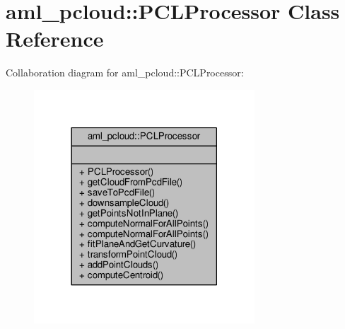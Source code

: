 \hypertarget{classaml__pcloud_1_1_p_c_l_processor}{\section{aml\-\_\-pcloud\-:\-:P\-C\-L\-Processor Class Reference}
\label{classaml__pcloud_1_1_p_c_l_processor}
}


Collaboration diagram for aml\-\_\-pcloud\-:\-:P\-C\-L\-Processor\-:
\nopagebreak
\begin{figure}[H]
\begin{center}
\leavevmode
\includegraphics[width=234pt]{classaml__pcloud_1_1_p_c_l_processor__coll__graph}
\end{center}
\end{figure}
